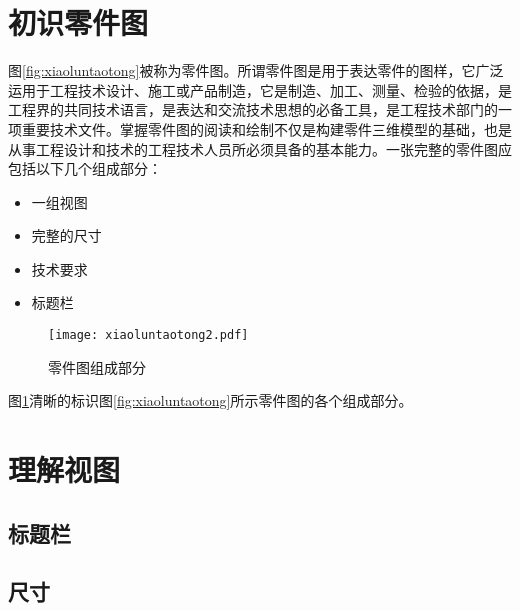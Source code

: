\section{初识零件图}
图\ref{fig:xiaoluntaotong}被称为零件图。所谓零件图是用于表达零件的图样，它广泛运用于工程技术设计、施工或产品制造，它是制造、加工、测量、检验的依据，是工程界的共同技术语言，是表达和交流技术思想的必备工具，是工程技术部门的一项重要技术文件。掌握零件图的阅读和绘制不仅是构建零件三维模型的基础，也是从事工程设计和技术的工程技术人员所必须具备的基本能力。一张完整的零件图应包括以下几个组成部分：
\begin{itemize}
\item 一组视图
\item 完整的尺寸
\item 技术要求
\item 标题栏
\end{itemize}
\begin{figure}[htbp]
\centering
\texttt{[image: xiaoluntaotong2.pdf]}
\caption{零件图组成部分}\label{fig:xiaoluntaotong2}
\end{figure}
图\ref{fig:xiaoluntaotong2}清晰的标识图\ref{fig:xiaoluntaotong}所示零件图的各个组成部分。
\section{理解视图}

\subsection{标题栏}
\subsection{尺寸}

\endinput